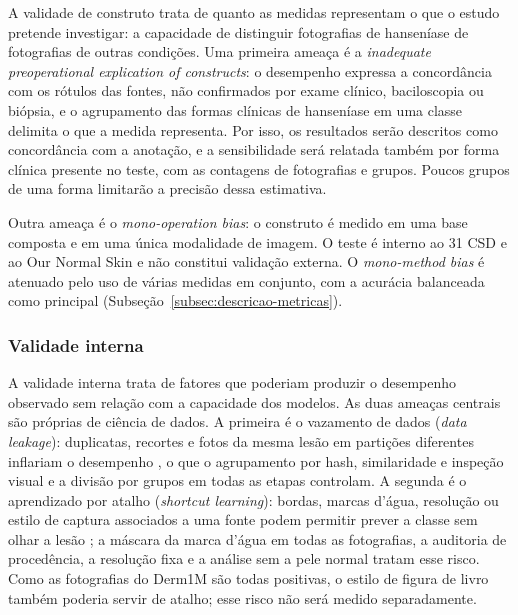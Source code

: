 A validade de construto trata de quanto as medidas representam o que o
estudo pretende investigar: a capacidade de distinguir fotografias de
hanseníase de fotografias de outras condições. Uma primeira ameaça é a
\textit{inadequate preoperational explication of constructs}: o desempenho
expressa a concordância com os rótulos das fontes, não confirmados por exame
clínico, baciloscopia ou biópsia, e o agrupamento das formas clínicas de
hanseníase em uma classe delimita o que a medida representa. Por isso, os
resultados serão descritos como concordância com a anotação, e a
sensibilidade será relatada também por forma clínica presente no teste,
com as contagens de fotografias e grupos. Poucos grupos de uma forma
limitarão a precisão dessa estimativa.

Outra ameaça é o \textit{mono-operation bias}: o construto é medido em uma
base composta e em uma única modalidade de imagem. O teste é interno ao
31 CSD e ao Our Normal Skin e não constitui validação externa. O \textit{mono-method bias}
é atenuado pelo uso de várias medidas em conjunto, com a acurácia
balanceada como principal (Subseção~\ref{subsec:descricao-metricas}).

\subsubsection*{Validade interna}

A validade interna trata de fatores que poderiam produzir o desempenho
observado sem relação com a capacidade dos modelos. As duas ameaças centrais
são próprias de ciência de dados. A primeira é o vazamento de dados
(\textit{data leakage}): duplicatas, recortes e fotos da mesma lesão em
partições diferentes inflariam o desempenho \cite{kapoor2023}, o que o
agrupamento por hash, similaridade e inspeção visual e a divisão por grupos
em todas as etapas controlam. A segunda é o aprendizado por atalho
(\textit{shortcut learning}): bordas, marcas d'água, resolução ou estilo de
captura associados a uma fonte podem permitir prever a classe sem olhar a
lesão \cite{geirhos2020}; a máscara da marca d'água em todas as
fotografias, a auditoria de procedência, a resolução fixa e a análise sem a
pele normal tratam esse risco. Como as fotografias do Derm1M são todas
positivas, o estilo de figura de livro também poderia servir de atalho;
esse risco não será medido separadamente.

